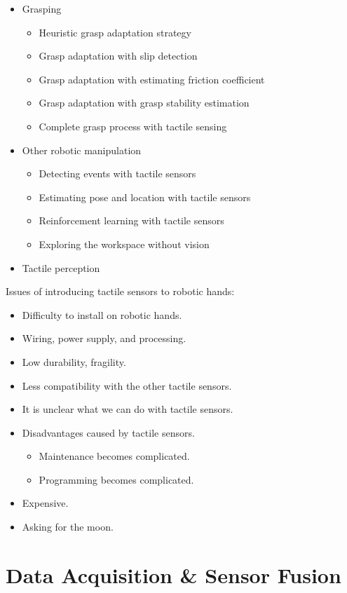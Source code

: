 \begin{itemize}
	\item Grasping
	\begin{itemize}
		\item Heuristic grasp adaptation strategy
		\item Grasp adaptation with slip detection
		\item Grasp adaptation with estimating friction coefficient
		\item Grasp adaptation with grasp stability estimation
		\item Complete grasp process with tactile sensing
	\end{itemize}
	\item Other robotic manipulation
	\begin{itemize}
		\item Detecting events with tactile sensors
		\item Estimating pose and location with tactile sensors
		\item Reinforcement learning with tactile sensors
		\item Exploring the workspace without vision
	\end{itemize}
	\item Tactile perception
\end{itemize}

Issues of introducing tactile sensors to robotic hands:
\begin{itemize}
	\item Difficulty to install on robotic hands.
	\item Wiring, power supply, and processing.
	\item Low durability, fragility.
	\item Less compatibility with the other tactile sensors.
	\item It is unclear what we can do with tactile sensors.
	\item Disadvantages caused by tactile sensors.
	\begin{itemize}
		\item Maintenance becomes complicated.
		\item Programming becomes complicated.
	\end{itemize}	
	\item Expensive.
	\item Asking for the moon.
\end{itemize}

\section{Data Acquisition \& Sensor Fusion}

